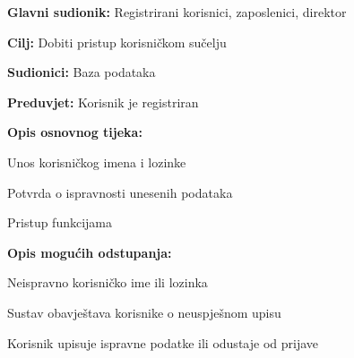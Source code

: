 			
			\noindent{}
			\begin{packed_item}
				
				\item \textbf{Glavni sudionik:} Registrirani korisnici, zaposlenici, direktor
				\item  \textbf{Cilj:} Dobiti pristup korisničkom sučelju
				\item  \textbf{Sudionici:} Baza podataka
				\item  \textbf{Preduvjet:} Korisnik je registriran
				\item  \textbf{Opis osnovnog tijeka:}
				
				\item[] \begin{packed_enum}
					
					\item Unos korisničkog imena i lozinke
					\item Potvrda o ispravnosti unesenih podataka
					\item Pristup funkcijama
					
				\end{packed_enum}
				
				\item  \textbf{Opis mogućih odstupanja:}
				
				\item[] \begin{packed_item}
					
					\item[2.a] Neispravno korisničko ime ili lozinka
					\item[] \begin{packed_enum}
						
						\item Sustav obavještava korisnike o neuspješnom upisu 
						\item Korisnik upisuje ispravne podatke ili odustaje od prijave
					\end{packed_enum}
					
				\end{packed_item}
			\end{packed_item}
			
